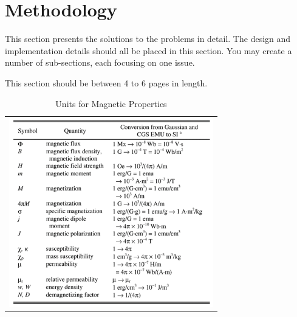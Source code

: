 \documentclass[10pt,journal,compsoc]{IEEEtran}
\begin{document}
%
%

\section{Methodology}
This section presents the solutions to the problems in detail. The design and implementation details should all be placed in this section. You may create a number of sub-sections, each focusing on one issue.

This section should be between 4 to 6 pages in length.

\begin{table}[!h]
\caption{Units for Magnetic Properties}
\label{table_example}
\centering
\begin{tabular}{c}
 \includegraphics[width=3.5in]{table1.png}
\end{tabular}
\end{table}
\end{document}

